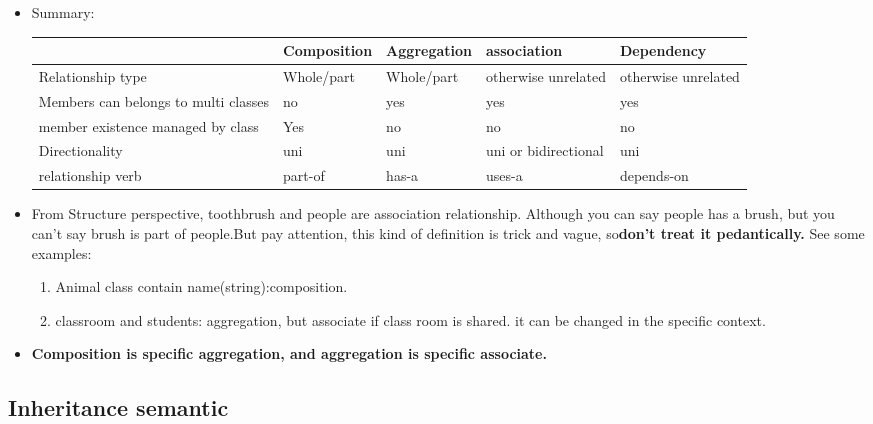 \documentclass[a4paper,11pt,twoside]{book}
\newcommand{\tophline}{\hline }
\newcommand{\bottomhline}{\\ \hline }
\newcommand{\tophline}{ }
\newcommand{\bottomhline}{ }
\begin{document}
\begin{itemize}
\begin{description}
	\end{description}
	
	\item Summary: \newline
	
	\begin{tabular}{|p{}|p{}|p{}|p{}|p{}|}
		\tophline 
		 & Composition  & Aggregation  & association & Dependency \\ 
		\tophline 
		Relationship type& Whole/part  & Whole/part  & otherwise unrelated  & otherwise unrelated  \\ 
		\tophline 
		Members can belongs to multi classes& no  & yes & yes & yes  \\ 
		\tophline 
		member existence managed by class& Yes & no & no   & no \\ 
		\tophline 
		Directionality & uni  & uni & uni or bidirectional & uni  \\ 
		\tophline 
		relationship verb& part-of & has-a & uses-a & depends-on 
		\bottomhline 
	\end{tabular} 
	
	\item From Structure perspective, toothbrush and people are association relationship. Although you can say people has a brush, but you can't say brush is part of people.But pay attention, this kind of definition is trick and vague, so\textbf{don't treat it pedantically.} See some examples:
	\begin{enumerate}
		\item Animal class contain name(string):composition.
		
		\item classroom and students: aggregation, but associate if class room is shared. it can be changed in the specific context.
	\end{enumerate}

	\item \textbf{Composition is specific aggregation, and aggregation is specific associate.}

\end{itemize}
	

\subsection{Inheritance semantic}
\end{document}
